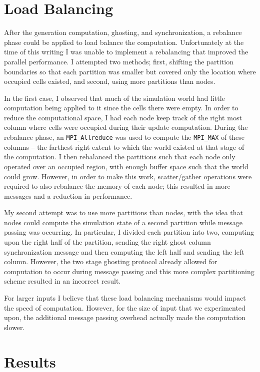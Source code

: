 \documentclass[11pt,letterpaper]{article}
\begin{document}
\section*{Load Balancing}

After the generation computation, ghosting, and synchronization, a rebalance phase could be applied to load balance the computation. Unfortunately at the time of this writing I was unable to implement a rebalancing that improved the parallel performance. I attempted two methods; first, shifting the partition boundaries so that each partition was smaller but covered only the location where occupied cells existed, and second, using more partitions than nodes.

In the first case, I observed that much of the simulation world had little computation being applied to it since the cells there were empty. In order to reduce the computational space, I had each node keep track of the right most column where cells were occupied during their update computation. During the rebalance phase, an \texttt{MPI\_Allreduce} was used to compute the \texttt{MPI\_MAX} of these columns -- the farthest right extent to which the world existed at that stage of the computation. I then rebalanced the partitions such that each node only operated over an occupied region, with enough buffer space such that the world could grow. However, in order to make this work, scatter/gather operations were required to also rebalance the memory of each node; this resulted in more messages and a reduction in performance.

My second attempt was to use more partitions than nodes, with the idea that nodes could compute the simulation state of a second partition while message passing was occurring. In particular, I divided each partition into two, computing upon the right half of the partition, sending the right ghost column synchronization message and then computing the left half and sending the left column. However, the two stage ghosting protocol already allowed for computation to occur during message passing and this more complex partitioning scheme resulted in an incorrect result.

For larger inputs I believe that these load balancing mechanisms would impact the speed of computation. However, for the size of input that we experimented upon, the additional message passing overhead actually made the computation slower.

\section*{Results}
\end{document}

